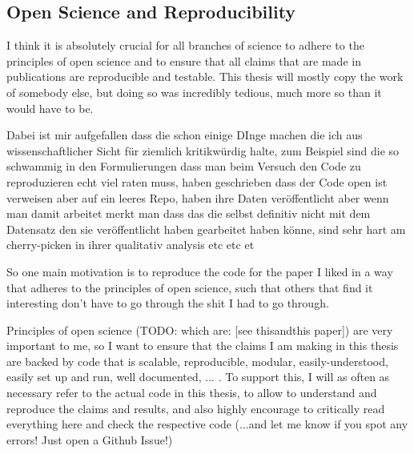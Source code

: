 \subsection{Open Science and Reproducibility}

I think it is absolutely crucial for all branches of science to adhere to the principles of open science and to ensure that all claims that are made in publications are reproducible and testable. This thesis will mostly copy the work of somebody else, but doing so was incredibly tedious, much more so than it would have to be.

Dabei ist mir aufgefallen dass die schon einige DInge machen die ich aus wissenschaftlicher Sicht für ziemlich kritikwürdig halte, zum Beispiel sind die so schwammig in den Formulierungen dass man beim Versuch den Code zu reproduzieren echt viel raten muss, haben geschrieben dass der Code open ist verweisen aber auf ein leeres Repo, haben ihre Daten veröffentlicht aber wenn man damit arbeitet merkt man dass das die selbst definitiv nicht mit dem Datensatz den sie veröffentlicht haben gearbeitet haben könne, sind sehr hart am cherry-picken in ihrer qualitativ  analysis etc etc et

So one main motivation is to reproduce the code for the paper I liked in a way that adheres to the principles of open science, such that others that find it interesting don't have to go through the shit I had to go through.

Principles of open science (TODO: which are: [see thisandthis paper]) are very important to me, so I want to ensure that the claims I am making in this thesis are backed by code that is scalable, reproducible, modular, easily-understood, easily set up and run, well documented, ... . To support this, I will as often as necessary refer to the actual code in this thesis, to allow to understand and reproduce the claims and results, and also highly encourage to critically read everything here and check the respective code (...and let me know if you spot any errors! Just open a Github Issue!)

